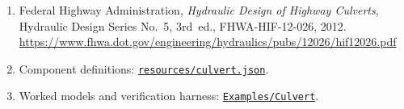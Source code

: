 \documentclass[11pt,a4paper]{article}
\newcommand{\file}[1]{\texttt{\small #1}}
\newcommand{\ghbase}{https://github.com/ArashMassoudieh/OpenHydroQual/blob/master}
\newcommand{\ghtree}{https://github.com/ArashMassoudieh/OpenHydroQual/tree/master}
\newcommand{\exfile}[1]{\href{\ghbase/#1}{\file{#1}}}
\newcommand{\exdir}[1]{\href{\ghtree/#1}{\file{#1}}}
\begin{document}
\begin{enumerate}[leftmargin=1.5em]
\item Federal Highway Administration, \emph{Hydraulic Design of Highway
      Culverts}, Hydraulic Design Series No.~5, 3rd~ed., FHWA-HIF-12-026, 2012.
      \url{https://www.fhwa.dot.gov/engineering/hydraulics/pubs/12026/hif12026.pdf}
\item Component definitions: \exfile{resources/culvert.json}.
\item Worked models and verification harness: \exdir{Examples/Culvert}.
\end{enumerate}
\end{document}
